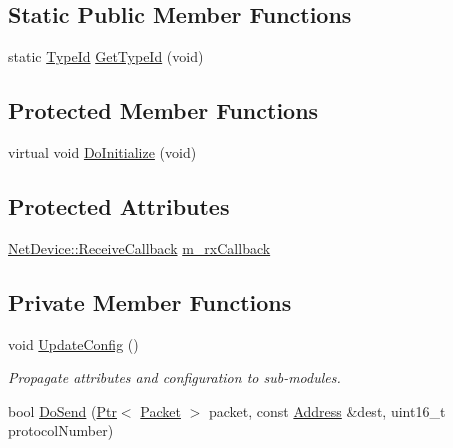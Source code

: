 \subsection*{Static Public Member Functions}
\begin{DoxyCompactItemize}
\item 
static \hyperlink{classns3_1_1TypeId}{Type\+Id} \hyperlink{classns3_1_1McUeNetDevice_a4f8fa1514631a9edfe9130c4195d393e}{Get\+Type\+Id} (void)
\end{DoxyCompactItemize}
\subsection*{Protected Member Functions}
\begin{DoxyCompactItemize}
\item 
virtual void \hyperlink{classns3_1_1McUeNetDevice_ae5c52ee299b9738a7c5f1d895ea803ed}{Do\+Initialize} (void)
\end{DoxyCompactItemize}
\subsection*{Protected Attributes}
\begin{DoxyCompactItemize}
\item 
\hyperlink{classns3_1_1NetDevice_ad5e5e1ca187472bc2ba99575d8def568}{Net\+Device\+::\+Receive\+Callback} \hyperlink{classns3_1_1McUeNetDevice_a0b31e145c1f08f7563b6c334f4d69244}{m\+\_\+rx\+Callback}
\end{DoxyCompactItemize}
\subsection*{Private Member Functions}
\begin{DoxyCompactItemize}
\item 
void \hyperlink{classns3_1_1McUeNetDevice_a89b711171a62e4bd848f6c42d42417eb}{Update\+Config} ()
\begin{DoxyCompactList}\small\item\em Propagate attributes and configuration to sub-\/modules. \end{DoxyCompactList}\item 
bool \hyperlink{classns3_1_1McUeNetDevice_a8bf10f1af8b4e8e8f0dbcb609ecacede}{Do\+Send} (\hyperlink{classns3_1_1Ptr}{Ptr}$<$ \hyperlink{classns3_1_1Packet}{Packet} $>$ packet, const \hyperlink{classns3_1_1Address}{Address} \&dest, uint16\+\_\+t protocol\+Number)
\end{DoxyCompactItemize}
